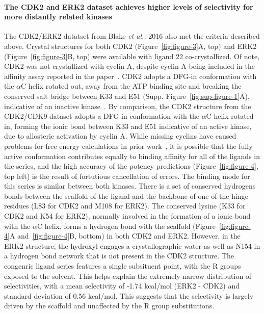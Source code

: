\documentclass[9pt,lineno]{elife-modified} %
\begin{document}
\paragraph{The CDK2 and ERK2 dataset achieves higher levels of selectivity for more distantly related kinases}
The CDK2/ERK2 datatset from Blake \emph{et al.,} 2016 also met the criteria described above. Crystal structures for both CDK2 (Figure~\ref{fig:figure-3}A, top) and ERK2 (Figure~\ref{fig:figure-3}B, top) were available with ligand 22 co-crystallized. Of note, CDK2 was not crystallized with cyclin A, despite cyclin A being included in the affinity assay reported in the paper~\citep{Blake2016-su}. CDK2 adopts a DFG-in conformation with the $\alpha$C helix rotated out, away from the ATP binding site and breaking the conserved salt bridge between K33 and E51 (Supp. Figure~\ref{fig:sup-figure-1}A), indicative of an inactive kinase~\citep{Huse2002-ml,Hari:2013dp}. By comparison, the CDK2 structure from the CDK2/CDK9 dataset adopts a DFG-in conformation with the $\alpha$C helix rotated in, forming the ionic bond between K33 and E51 indicative of an active kinase, due to allosteric activation by cyclin A. While missing cyclins have caused problems for free energy calculations in prior work~, it is possible that the fully active conformation contributes equally to binding affinity for all of the ligands in the series, and the high accuracy of the potency predictions (Figure~\ref{fig:figure-4}, top left) is the result of fortutious cancellation of errors. The binding mode for this series is similar between both kinases. There is a set of conserved hydrogens bonds between the scaffold of the ligand and the backbone of one of the hinge residues (L83 for CDK2 and M108 for ERK2). The conserved lysine (K33 for CDK2 and K54 for ERK2), normally involved in the formation of a ionic bond with the $\alpha$C helix, forms a hydrogen bond with the scaffold (Figure~\ref{fig:figure-4}A and~\ref{fig:figure-4}B, bottom) in both CDK2 and ERK2. However, in the ERK2 structure, the hydroxyl engages a crystallographic water as well as N154 in a hydrogen bond network that is not present in the CDK2 structure. 
The congenric ligand series features a single subsituent point, with the R groups exposed to the solvent. This helps explain the extremely narrow distribution of selectivities, with a mean selectivity of -1.74 kcal/mol (ERK2 - CDK2) and standard deviation of 0.56 kcal/mol. This suggests that the selectivity is largely driven by the scaffold and unaffected by the R group substitutions.
\end{document}
